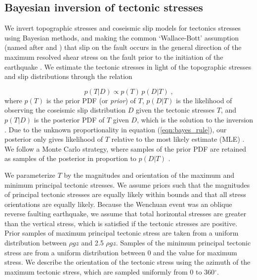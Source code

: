 \documentclass[draft,jgrga]{AGUTeX}
\begin{document}
\begin{article}
\subsection{Bayesian inversion of tectonic
stresses}\label{bayesian-inversion-of-tectonic-stresses}

We invert topographic stresses and coseismic slip models for tectonics
stresses using Bayesian methods, and making the common `Wallace-Bott'
assumption (named after \citet{wallace1951} and \citet{bott1959}) that
slip on the fault occurs in the general direction of the maximum
resolved shear stress on the fault prior to the initiation of the
earthquake \citep[e.g.,][] {mckenzie1969, angelier1994}. We estimate
the tectonic stresses in light of the topographic stresses and slip
distributions through the relation

\begin{equation} 
p(T|D) \propto p(T) \, p(D|T) \; , 
\label{eqn:bayes_rule} 
\end{equation}
where $p(T)$ is the prior PDF (or \emph{prior}) of $T$, $p(D|T)$ is the
likelihood of observing the coseismic slip distribution $D$ given the
tectonic stresses $T$, and $p(T|D)$ is the posterior PDF of $T$ given
$D$, which is the solution to the inversion \citep[e.g.,][]{mosegaard1995}.
Due to the unknown proportionality in equation (\ref{eqn:bayes_rule}),
our posterior only gives likelihood of $T$ relative to the most likely
estimate (MLE) \citep{tarantola2005}. We follow a Monte Carlo strategy,
where samples of the prior PDF are retained as samples of the posterior
in proportion to $p(D|T)$ \citep[e.g.,][]{mosegaard1995}.

We parameterize $T$ by the magnitudes and orientation of the maximum and
minimum principal tectonic stresses. We assume priors such that the
magnitudes of principal tectonic stresses are equally likely within
bounds and that all stress orientations are equally likely. Because the
Wenchuan event was an oblique reverse faulting earthquake, we assume
that total horizontal stresses are greater than the vertical stress,
which is satisfied if the tectonic stresses are positive. Prior samples
of maximum principal tectonic stress are taken from a uniform distribution
between $\rho g z$ and 2.5 $\rho g z$. Samples of the minimum principal
tectonic stress are from a uniform distribution between 0 and the value for
maximum stress. We describe the orientation of the tectonic stress using
the azimuth of the maximum tectonic stress, which are sampled uniformly
from 0 to 360$^{\circ}$.


\end{article}
\end{document}
